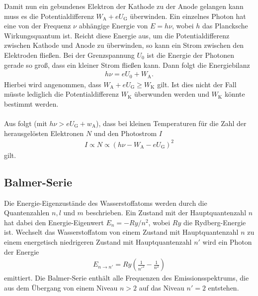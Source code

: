Damit nun ein gebundenes Elektron der Kathode zu der Anode gelangen kann muss es die Potentialdifferenz $W_\mathrm{A}+eU_\mathrm{G}$ überwinden. Ein einzelnes Photon hat eine von der Frequenz $\nu$ abhängige Energie von $E=h\nu$, wobei $h$ das Plancksche Wirkungsquantum ist. Reicht diese Energie aus, um die Potentialdifferenz zwischen Kathode und Anode zu überwinden, so kann ein Strom zwischen den Elektroden fließen. Bei der Grenzspannung $U_0$ ist die Energie der Photonen gerade so groß, dass ein kleiner Strom fließen kann. Dann folgt die Energiebilanz
\begin{align}
  h\nu=eU_0+W_\mathrm{A}.
\end{align}
Hierbei wird angenommen, dass $W_\mathrm{A}+eU_\mathrm{G} \geq W_\mathrm{K}$ gilt. Ist dies nicht der Fall müsste lediglich die Potentialdifferenz $W_\mathrm{K}$ überwunden werden und $W_\mathrm{K}$ könnte bestimmt werden. \\ \\
Aus \cite{kennlinie} folgt (mit $h\nu>eU_\mathrm{G}+w_\mathrm{A}$), dass bei kleinen Temperaturen für die Zahl der herausgelösten Elektronen $N$ und den Photostrom $I$
\begin{align}
  I \propto N \propto \left(  h\nu-W_\mathrm{A}-eU_\mathrm{G}\right)^2
\end{align} 
gilt. 

\newpage

\subsection{Balmer-Serie}
Die Energie-Eigenzustände des Wasserstoffatoms werden durch die Quantenzahlen $n,l$ und $m$ beschrieben. Ein Zustand mit der Hauptquantenzahl $n$ hat dabei den Energie-Eigenwert $E_n=-Ry/n^2$, wobei $Ry$ die Rydberg-Energie ist. Wechselt das Wasserstoffatom von einem Zustand mit Hauptquantenzahl $n$ zu einem energetisch niedrigeren Zustand mit Hauptquantenzahl $n'$ wird ein Photon der Energie 
\begin{align}
  E_{n \rightarrow n'}=Ry \left( \frac{1}{n'^2} - \frac{1}{n^2}\right)
\end{align}
emittiert. Die Balmer-Serie enthält alle Frequenzen des Emissionsspektrums, die aus dem Übergang von einem Niveau $n>2$ auf das Niveau $n'=2$ entstehen.

